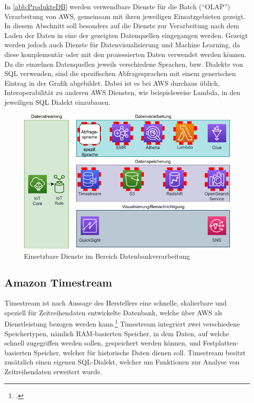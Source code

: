 In \autoref{abb:ProdukteDB} werden verwendbare Dienste für die Batch (\enquote{\ac{OLAP}}) Verarbeitung von \ac{AWS}, gemeinsam mit ihren jeweiligen Einsatzgebieten gezeigt. In diesem Abschnitt soll besonders auf die Dienste zur Verarbeitung nach dem Laden der Daten in eine der gezeigten Datenquellen eingegangen werden. Gezeigt werden jedoch auch Dienste für Datenvisualisierung und Machine Learning, da diese komplementär oder mit den prozessierten Daten verwendet werden können. Da die einzelnen Datenquellen jeweils verschiedene Sprachen, bzw. Dialekte von \ac{SQL} verwenden, sind die spezifischen Abfragesprachen mit einem generischen Eintrag in der Grafik abgebildet. Dabei ist es bei \ac{AWS} durchaus üblich, Interoperabilität zu anderen \ac{AWS} Diensten, wie beispielsweise Lambda, in den jeweiligen \ac{SQL} Dialekt einzubauen.

\begin{figure}[H]
\centering
\includegraphics[width=\textwidth]{graphics/Overview-DB.pdf}
\caption{Einsetzbare Dienste im Bereich Datenbankverarbeitung}
\label{abb:ProdukteDB}
\end{figure}

\subsection{Amazon Timestream}
Timestream ist nach Aussage des Herstellers eine schnelle, skalierbare und speziell für Zeitreihendaten entwickelte Datenbank, welche über \ac{AWS} als Dienstleistung bezogen werden kann.\footcite[Vgl. auch im Folgenden][]{AmazonWebServicesInc..o.J.h} Timestream integriert zwei verschiedene Speichertypen, nämlich \ac{RAM}-basierten Speicher, in dem Daten, auf welche schnell zugegriffen werden sollen, gespeichert werden können, und Festplatten-basierten Speicher, welcher für historische Daten dienen soll.
Timestream besitzt zusätzlich einen eigenen \ac{SQL}-Dialekt, welcher um Funktionen zur Analyse von Zeitreihendaten erweitert wurde. 

